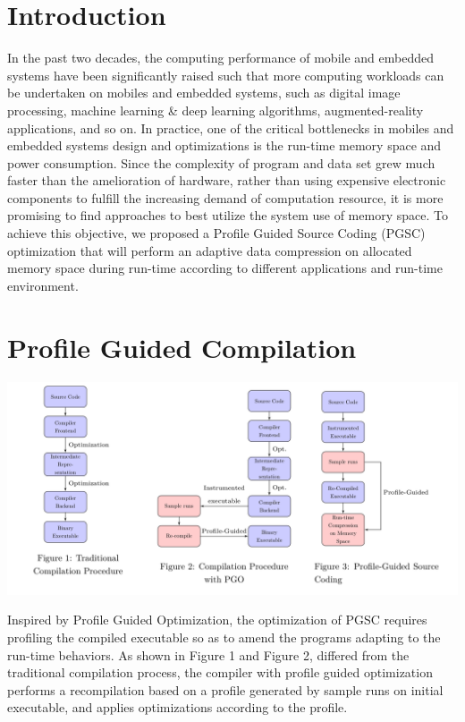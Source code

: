 \documentclass[a0,portrait]{a0poster}
\begin{document}
\begin{multicols}{2}
\color{SaddleBrown} %

\section*{Introduction}

In the past two decades, the computing performance of mobile and embedded systems have been significantly raised such that more computing workloads can be undertaken on mobiles and embedded systems, such as digital image processing, machine learning \& deep learning algorithms, augmented-reality applications, and so on. In practice, one of the critical bottlenecks in mobiles and embedded systems design and optimizations is the run-time memory space and power consumption. Since the complexity of program and data set grew much faster than the amelioration of hardware, rather than using expensive electronic components to fulfill the increasing demand of computation resource, it is more promising to find approaches to best utilize the system use of memory space. To achieve this objective, we proposed a Profile Guided Source Coding (PGSC) optimization that will perform an adaptive data compression on allocated memory space during run-time according to different applications and run-time environment. 

\color{DarkSlateGray} %

\section*{Profile Guided Compilation}
\vspace{1cm}

\includegraphics[width=\linewidth]{fig1}

\vspace{1cm}

Inspired by Profile Guided Optimization, the optimization of PGSC requires profiling the compiled executable so as to amend the programs adapting to the run-time behaviors. As shown in Figure 1 and Figure 2, differed from the traditional compilation process, the compiler with profile guided optimization performs a recompilation based on a profile generated by sample runs on initial executable, and applies optimizations according to the profile. 


\end{multicols}
\end{document}

